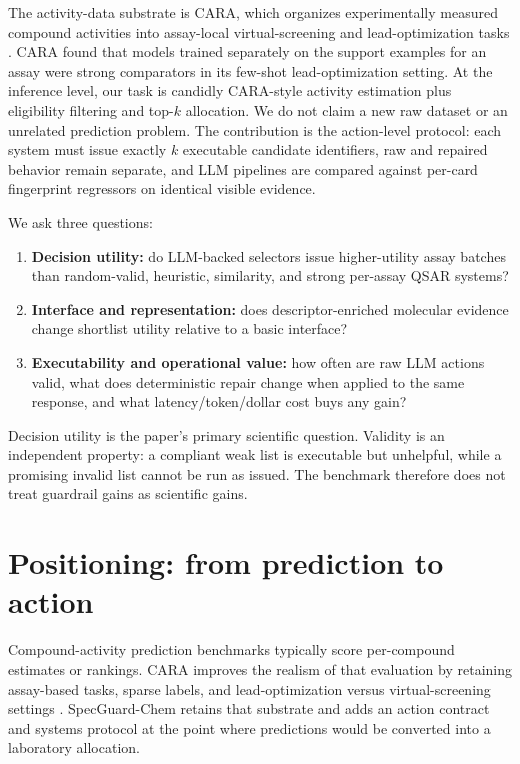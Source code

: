 \documentclass[10pt,a4paper]{article}
\begin{document}
The activity-data substrate is CARA, which organizes experimentally measured
compound activities into assay-local virtual-screening and lead-optimization
tasks \cite{tian2024cara,cara2024dataset}. CARA found that models trained
separately on the support examples for an assay were strong comparators in its
few-shot lead-optimization setting. At the inference level, our task is
candidly CARA-style activity estimation plus eligibility filtering and
top-$k$ allocation. We do not claim a new raw dataset or an unrelated
prediction problem. The contribution is the action-level protocol: each system
must issue exactly $k$ executable candidate identifiers, raw and repaired
behavior remain separate, and LLM pipelines are compared against per-card
fingerprint regressors on identical visible evidence.

We ask three questions:
\begin{enumerate}
  \item \textbf{Decision utility:} do LLM-backed selectors issue higher-utility
  assay batches than random-valid, heuristic, similarity, and strong per-assay
  QSAR systems?
  \item \textbf{Interface and representation:} does descriptor-enriched
  molecular evidence change shortlist utility relative to a basic interface?
  \item \textbf{Executability and operational value:} how often are raw LLM
  actions valid, what does deterministic repair change when applied to the same
  response, and what latency/token/dollar cost buys any gain?
\end{enumerate}

Decision utility is the paper's primary scientific question. Validity is an
independent property: a compliant weak list is executable but unhelpful, while
a promising invalid list cannot be run as issued. The benchmark therefore does
not treat guardrail gains as scientific gains.

\section{Positioning: from prediction to action}

Compound-activity prediction benchmarks typically score per-compound estimates
or rankings. CARA improves the realism of that evaluation by retaining
assay-based tasks, sparse labels, and lead-optimization versus virtual-screening
settings \cite{tian2024cara}. SpecGuard-Chem retains that substrate and adds an
action contract and systems protocol at the point where predictions would be
converted into a laboratory allocation.
\end{document}
